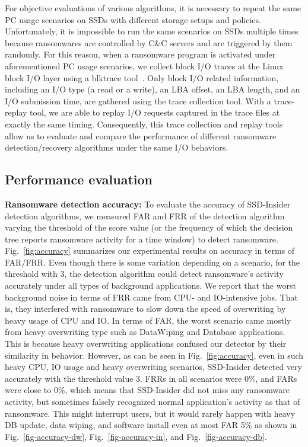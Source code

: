 \documentclass[conference]{IEEEtran}
\newcommand{\ours}{SSD-Insider}
\begin{document}
For objective evaluations of various algorithms, it is necessary to
repeat the same PC usage scenarios on SSDs with different storage
setups and policies.  Unfortunately, it is impossible to run the
same scenarios on SSDs multiple times because ransomwares are
controlled by C\&C servers and are triggered by them randomly. For
this reason, when a ransomware program is activated under
aforementioned PC usage scenarios, we collect block I/O traces at
the Linux block I/O layer using a blktrace tool~\cite{blktrace}.
Only block I/O related information, including an I/O type (a read
or a write), an LBA offset, an LBA length, and an I/O submission
time, are gathered using the trace collection tool.  With a
trace-replay tool, we are able to replay I/O requests captured in
the trace files at exactly the same timing.  Consequently, this
trace collection and replay tools allow us to evaluate and compare
the performance of different ransomware detection/recovery
algorithms under the same I/O behaviors. 


\subsection{Performance evaluation}\label{sec:peval}
{\bf Ransomware detection accuracy:}
To evaluate the accuracy of SSD-Insider detection algorithms, we
measured FAR and FRR of the detection algorithm varying the
threshold of the score value (or the frequency of which the
decision tree reports ransomware activity for a time window) to
detect ransomware.  Fig.~\ref{fig:accuracy} summarizes our
experimental results on accuracy in terms of FAR/FRR.  Even though
there is some variation depending on a scenario, for the threshold
with 3, the detection algorithm could detect ransomware's
activity accurately under all types of background applications.  We
report that the worst background noise in terms of FRR 
came from CPU- and IO-intensive jobs.  
That is, they interfered with ransomware to
slow down the speed of overwriting by heavy usage of CPU and IO.
In terms of FAR, the worst scenario
came mostly from heavy overwriting type such as DataWiping and Database applications. 
This is because heavy overwriting applications confused our detector by
their similarity in behavior.
However, as can be seen in Fig.~\ref{fig:accuracy}, even in such
heavy CPU, IO usage and heavy overwriting scenarios, \ours{} detected very accurately
with the threshold value 3.  
FRRs in all scenarios were 0\%, and FARs were close to 0\%, 
which means that \ours{} did not miss any ransomware activity, 
but sometimes falsely recognized normal application's activity as that of ransomware.
This might interrupt users, but it would rarely happen with heavy
DB update, data wiping, and software install even at most FAR 5\%
as shown in Fig.~\ref{fig-accuracy-dw}, Fig.~\ref{fig-accuracy-in},
and Fig.~\ref{fig-accuracy-db}.
\end{document}

